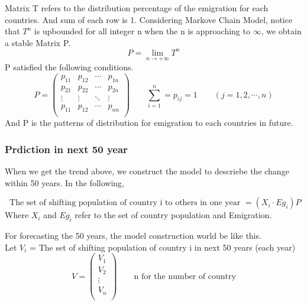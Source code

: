 \documentclass{mcmthesis}
\begin{document}
Matrix T refers to the distribution percentage of the emigration for each countries.
And sum of each row is 1. Considering Markove Chain Model, notice that $T^n$ is upbounded for all integer n when
the n is approaching to $\infty$, we obtain a stable Matrix P.
\begin{displaymath}
P=\lim_{n \to +\infty}T^n
\end{displaymath}
P satisfied the following conditions.
\begin{displaymath}
P=
  \begin{pmatrix}
  {p_{11} } & {p_{12} } & \cdots &{p_{1n} }  \\
  {p_{21} } & {p_{22} } & \cdots & {p_{2n} }  \\
  {\vdots } &  {\vdots }  & \ddots &   \vdots \\
  {p_{11} } & {p_{12} } & \cdots &{p_{nn} }  \\
  \end{pmatrix}
  \qquad \sum^n_{i=1}=p_{ij}=1 \qquad (j=1,2,\cdots,n)
\end{displaymath}
\qquad And P is the patterns of distribution for emigration to each countries in future.

\subsubsection{Prdiction in next 50 year}
When we get the trend above, we construct the model to descriebe the change within 50 years.
In the following,

\begin{equation}
 \text{ The set of shifting population of country i to others in one year }= (X_{i} \cdot Eg_{i})P
\end{equation}
Where $X_{i}$ and $ Eg_{i}$ refer to the set of country population and Emigration.

For forecasting the 50 years, the model construction world be like this.\\
Let $V_i$ = The set of shifting population of country i in next 50 years (each year) 
\begin{displaymath}
V=\begin{pmatrix}
  {V_{1} }  \\
  {V_{2} }  \\
  {\vdots } \\
  {V_{n} }  \\
  \end{pmatrix}
\qquad  \text {n for the number of country}
\end{displaymath}
\end{document}
